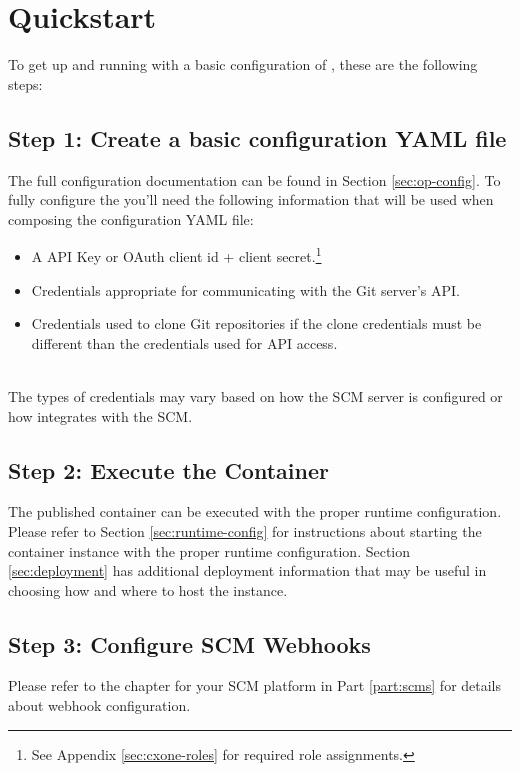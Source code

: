 \chapter{Quickstart}

To get up and running with a basic configuration of \cxoneflowns, these are the following steps:


\section{Step 1: Create a basic configuration YAML file}

The full configuration documentation can be found in Section \ref{sec:op-config}. To fully configure the \cxoneflow you'll need
the following information that will be used when composing the configuration YAML file:

\begin{itemize}
    \item A \cxone API Key or OAuth client id + client secret.\footnote{See Appendix \ref{sec:cxone-roles} for required role assignments.}
    \item Credentials appropriate for communicating with the Git server's API.
    \item Credentials used to clone Git repositories if the clone credentials must be different than the credentials used for API access.
\end{itemize}

\noindent\\The types of credentials may vary based on how the SCM server is configured or how \cxoneflow
integrates with the SCM.

\section{Step 2: Execute the \cxoneflowtext\space Container}

The published \cxoneflow container can be executed with the proper runtime configuration.  Please refer
to Section \ref{sec:runtime-config} for instructions about starting the \cxoneflow container instance with
the proper runtime configuration. Section \ref{sec:deployment} has additional deployment information that
may be useful in choosing how and where to host the \cxoneflow instance.


\section{Step 3: Configure SCM Webhooks}

Please refer to the chapter for your SCM platform in Part \ref{part:scms} for details about webhook configuration.


